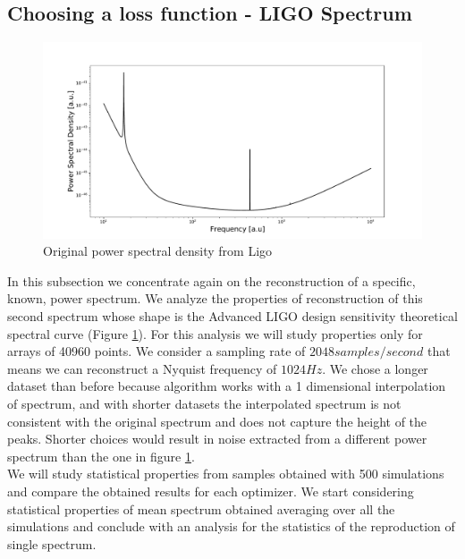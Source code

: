 \documentclass[twocolumn,showpacs,preprintnumbers,nofootinbib,prd,
superscriptaddress,10pt]{revtex4-1}
\begin{document}



\subsection{Choosing a loss function - LIGO Spectrum} \label{sec:LIGO_validation}
\begin{figure}
    \centering
    \includegraphics[width = \linewidth]{Images/LIGOsimulate/LigoPSDoriginal.pdf}
    \caption{Original power spectral density from Ligo}
    \label{fig:LigoPSDOriginal}
\end{figure}
In this subsection we concentrate again on the reconstruction of a specific, known, power spectrum.
We analyze the properties of reconstruction of this second spectrum whose shape is the Advanced LIGO design sensitivity theoretical spectral curve (Figure \ref{fig:LigoPSDOriginal}). 
For this analysis we will study properties only for arrays of 40960 points. We consider a sampling rate of $2048 samples / second$ that means we can reconstruct a Nyquist frequency of $1024 Hz$. We chose a longer dataset than before because algorithm works with a 1 dimensional interpolation of spectrum, and with shorter datasets the interpolated spectrum is not consistent with the original spectrum and does not capture the height of the peaks. Shorter choices would result in noise extracted from a different power spectrum than the one in figure \ref{fig:LigoPSDOriginal}. \\ 
We will study statistical properties from samples obtained with 500 simulations and compare the obtained results for each optimizer. 
We start considering statistical properties of mean spectrum obtained averaging over all the simulations and conclude with an analysis for the statistics of the reproduction of single spectrum. 
\end{document}
